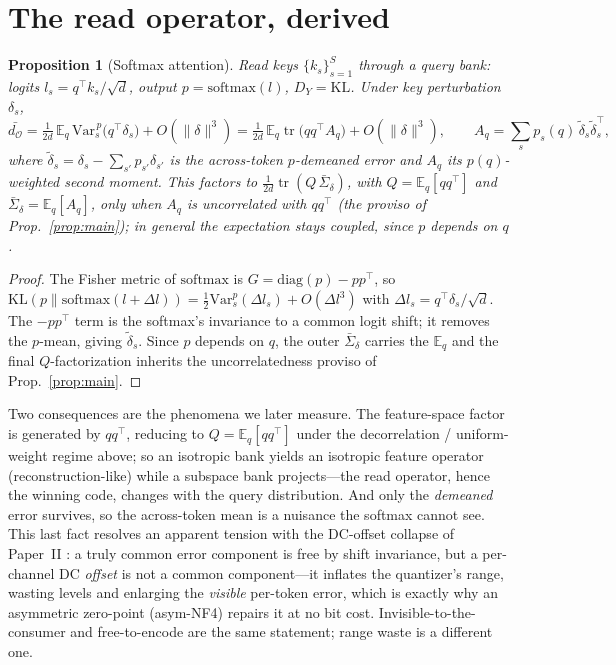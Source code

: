 \documentclass[11pt]{article}
\newtheorem{proposition}{Proposition}
\theoremstyle{definition}
\theoremstyle{remark}
\newcommand{\tr}{\operatorname{tr}}
\newcommand{\dO}{d_{\mathcal{O}}}
\newcommand{\E}{\mathbb{E}}
\begin{document}
\section{The read operator, derived}\label{sec:readop}

\begin{proposition}[Softmax attention]\label{prop:softmax}
Read keys $\{k_s\}_{s=1}^{S}$ through a query bank: logits $l_s=q^\top k_s/\sqrt{d}$,
output $p=\mathrm{softmax}(l)$, $D_Y=\mathrm{KL}$. Under key perturbation $\delta_s$,
\[
\bar{\dO}=\tfrac{1}{2d}\,\E_q\,\mathrm{Var}^{\,p}_s\!\big(q^\top\delta_s\big)
+O(\|\delta\|^3)
=\tfrac{1}{2d}\,\E_q\tr\!\big(qq^\top A_q\big)+O(\|\delta\|^3),
\qquad A_q=\sum_s p_s(q)\,\tilde\delta_s\tilde\delta_s^\top,
\]
where $\tilde\delta_s=\delta_s-\sum_{s'}p_{s'}\delta_{s'}$ is the across-token
$p$-demeaned error and $A_q$ its $p(q)$-weighted second moment. This
\emph{factors} to $\tfrac{1}{2d}\tr(Q\,\bar\Sigma_\delta)$, with $Q=\E_q[qq^\top]$
and $\bar\Sigma_\delta=\E_q[A_q]$, \emph{only} when $A_q$ is uncorrelated with
$qq^\top$ (the proviso of Prop.~\ref{prop:main}); in general the expectation stays
coupled, since $p$ depends on $q$.
\end{proposition}
\begin{proof}
The Fisher metric of $\mathrm{softmax}$ is $G=\mathrm{diag}(p)-pp^\top$, so
$\mathrm{KL}(p\|\mathrm{softmax}(l+\Delta l))=\tfrac12\mathrm{Var}^p_s(\Delta l_s)
+O(\Delta l^3)$ with $\Delta l_s=q^\top\delta_s/\sqrt d$. The $-pp^\top$ term is the
softmax's invariance to a common logit shift; it removes the $p$-mean, giving
$\tilde\delta_s$. Since $p$ depends on $q$, the outer $\bar\Sigma_\delta$ carries the
$\E_q$ and the final $Q$-factorization inherits the uncorrelatedness proviso of
Prop.~\ref{prop:main}.
\end{proof}
Two consequences are the phenomena we later measure. The feature-space factor is
generated by $qq^\top$, reducing to $Q=\E_q[qq^\top]$ under the decorrelation /
uniform-weight regime above; so an isotropic bank yields an isotropic feature
operator (reconstruction-like) while a subspace bank projects---the read operator,
hence the winning code, changes with the query distribution. And only the
\emph{demeaned} error survives, so the across-token mean is a nuisance the softmax
cannot see. This last fact resolves an apparent tension with the DC-offset
collapse of Paper~II \cite{paper2}: a truly common error component is free by shift
invariance, but a per-channel DC \emph{offset} is not a common component---it inflates
the quantizer's range, wasting levels and enlarging the \emph{visible} per-token
error, which is exactly why an asymmetric zero-point (asym-NF4) repairs it at no bit
cost. Invisible-to-the-consumer and free-to-encode are the same statement; range
waste is a different one.
\end{document}
